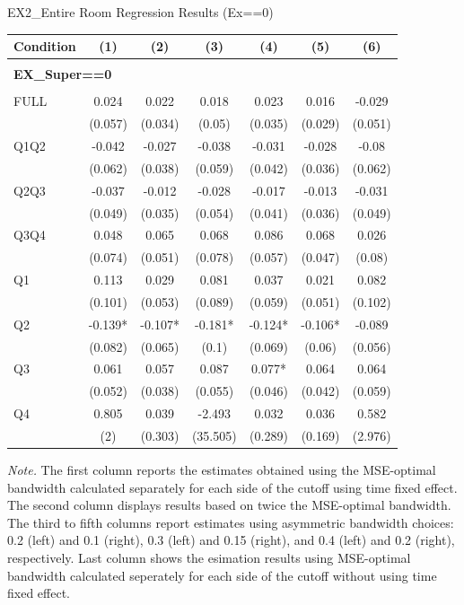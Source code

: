 \begin{table}[]
\TABLE
{EX2_Entire Room Regression Results (Ex==0) \label{ex2_result_detail2}}{\begin{tabular}{lcccccc}
\hline
Condition & (1) & (2) & (3) & (4) & (5) & (6) \\ \hline
\\ 
\multicolumn{5}{l}{\textbf{EX\_Super==0}} \\ 
\\ 
FULL & 0.024 & 0.022 & 0.018 & 0.023 & 0.016 & -0.029 \\ 
&(0.057)&(0.034) & (0.05)&(0.035)&(0.029)&(0.051)\\ 
Q1Q2 & -0.042 & -0.027 & -0.038 & -0.031 & -0.028 & -0.08 \\ 
&(0.062)&(0.038) & (0.059)&(0.042)&(0.036)&(0.062)\\ 
Q2Q3 & -0.037 & -0.012 & -0.028 & -0.017 & -0.013 & -0.031 \\ 
&(0.049)&(0.035) & (0.054)&(0.041)&(0.036)&(0.049)\\ 
Q3Q4 & 0.048 & 0.065 & 0.068 & 0.086 & 0.068 & 0.026 \\ 
&(0.074)&(0.051) & (0.078)&(0.057)&(0.047)&(0.08)\\ 
Q1 & 0.113 & 0.029 & 0.081 & 0.037 & 0.021 & 0.082 \\ 
&(0.101)&(0.053) & (0.089)&(0.059)&(0.051)&(0.102)\\ 
Q2 & -0.139* & -0.107* & -0.181* & -0.124* & -0.106* & -0.089 \\ 
&(0.082)&(0.065) & (0.1)&(0.069)&(0.06)&(0.056)\\ 
Q3 & 0.061 & 0.057 & 0.087 & 0.077* & 0.064 & 0.064 \\ 
&(0.052)&(0.038) & (0.055)&(0.046)&(0.042)&(0.059)\\ 
Q4 & 0.805 & 0.039 & -2.493 & 0.032 & 0.036 & 0.582 \\ 
&(2)&(0.303) & (35.505)&(0.289)&(0.169)&(2.976)\\ 
\hline 
 \end{tabular}}{\textit{Note.} The first column reports the estimates obtained using the MSE-optimal bandwidth calculated separately for each side of the cutoff using time fixed effect. The second column displays results based on twice the MSE-optimal bandwidth. The third to fifth columns report estimates using asymmetric bandwidth choices: 0.2 (left) and 0.1 (right), 0.3 (left) and 0.15 (right), and 0.4 (left) and 0.2 (right), respectively. Last column shows the esimation results using MSE-optimal bandwidth calculated seperately for each side of the cutoff without using time fixed effect.}
\end{table}
